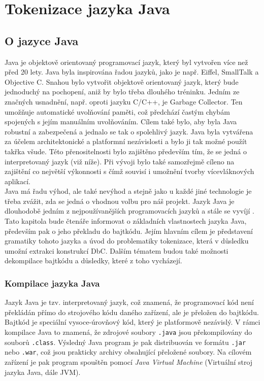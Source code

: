 \chapter{Tokenizace jazyka Java}

	\section{O jazyce Java}
		Java \cite{javaEnviroment} je objektově orientovaný programovací jazyk, který byl vytvořen více než před 20 lety. Java byla inspirována řadou jazyků, jako je např. Eiffel, SmallTalk a Objective C. Snahou bylo vytvořit objektově orientovaný jazyk, který bude jednoduchý na pochopení, aniž by bylo třeba dlouhého tréninku. Jedním ze značných usnadnění, např. oproti jazyku C/C++, je Garbage Collector. Ten umožňuje automatické uvolňování paměti, což předchází častým chybám spojených s jejím manuálním uvolňováním.	Cílem také bylo, aby byla Java robustní a zabezpečená a jednalo se tak o spolehlivý jazyk. Java byla vytvářena za účelem architektonické a platformní nezávislosti a bylo ji tak možné použít takřka všude. Této přenositelnosti bylo zajištěno především tím, že se jedná o interpretovaný jazyk (viž níže). Při vývoji bylo také samozřejmě cíleno na zajištění co největší výkonnosti s čímž souvisí i umožnění tvorby vícevláknových aplikací.\\
		
		Java má řadu výhod, ale také nevýhod a stejně jako u každé jiné technologie je třeba zvážit, zda se jedná o vhodnou volbu pro náš projekt. Jazyk Java je dlouhodobě jedním z nejpoužívanějších programovacích jazyků a stále se vyvíjí \cite{javaTrend}.\\
		
		Tato kapitola bude čtenáře informovat o základních vlastnostech jazyka Java, především pak o jeho překladu do bajtkódu. Jejím hlavním cílem je představení gramatiky tohoto jazyka a úvod do problematiky tokenizace, která v důsledku umožní extrakci konstrukcí DbC. Dalším tématem budou také možnosti dekompilace bajtkódu a důsledky, které z toho vycházejí.
		
		
		\subsection{Kompilace jazyka Java}	
			Jazyk Java je tzv. interpretovaný jazyk, což znamená, že programovací kód není překládán přímo do strojového kódu daného zařízení, ale je přeložen do bajtkódu. Bajtkód je speciální vysoce-úrovňový kód, který je platformově nezávislý. V rámci kompilace Java to znamená, že zdrojové soubory \texttt{.java} jsou překompilovány do souborů \texttt{.class}. Výsledný Java program je pak distribuován ve formátu \texttt{.jar} nebo \texttt{.war}, což jsou prakticky archivy obsahující přeložené soubory. Na cílovém zařízení je pak program spouštěn pomocí \emph{Java Virtual Machine} (Virtuální stroj jazyka Java, dále JVM).
			
